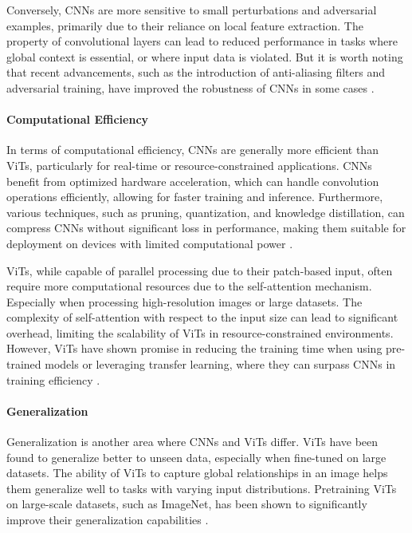 Conversely, CNNs are more sensitive to small perturbations and adversarial examples, primarily due to their reliance on local feature extraction. The property of convolutional layers can lead to reduced performance in tasks where global context is essential, or where input data is violated. But it is worth noting that recent advancements, such as the introduction of anti-aliasing filters and adversarial training, have improved the robustness of CNNs in some cases \cite{app13095521}.

\paragraph{Computational Efficiency}

In terms of computational efficiency, CNNs are generally more efficient than ViTs, particularly for real-time or resource-constrained applications. CNNs benefit from optimized hardware acceleration, which can handle convolution operations efficiently, allowing for faster training and inference. Furthermore, various techniques, such as pruning, quantization, and knowledge distillation, can compress CNNs without significant loss in performance, making them suitable for deployment on devices with limited computational power \cite{app13095521}.

ViTs, while capable of parallel processing due to their patch-based input, often require more computational resources due to the self-attention mechanism. Especially when processing high-resolution images or large datasets. The complexity of self-attention with respect to the input size can lead to significant overhead, limiting the scalability of ViTs in resource-constrained environments. However, ViTs have shown promise in reducing the training time when using pre-trained models or leveraging transfer learning, where they can surpass CNNs in training efficiency \cite{app13095521}.

\paragraph{Generalization}

Generalization is another area where CNNs and ViTs differ. ViTs have been found to generalize better to unseen data, especially when fine-tuned on large datasets. The ability of ViTs to capture global relationships in an image helps them generalize well to tasks with varying input distributions. Pretraining ViTs on large-scale datasets, such as ImageNet, has been shown to significantly improve their generalization capabilities \cite{app13095521}.

